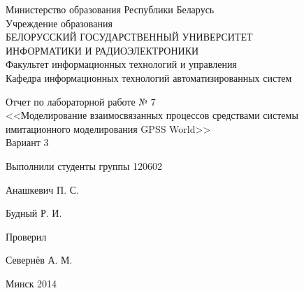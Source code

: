 \thispagestyle{empty}
\setlength{\parindent}{0ex} %

\begin{center}
  Министерство образования Республики Беларусь \\
  \vspace{0.5ex}
  Учреждение образования \\
  БЕЛОРУССКИЙ ГОСУДАРСТВЕННЫЙ УНИВЕРСИТЕТ \\
  ИНФОРМАТИКИ И РАДИОЭЛЕКТРОНИКИ \\
  \vspace{0.5ex}
  Факультет информационных технологий и управления \\
  \vspace{0.5ex}
  Кафедра информационных технологий автоматизированных систем
\end{center}

\vspace{50mm}

\begin{center}
  Отчет по лабораторной работе № 7 \\
  <<Моделирование взаимосвязанных процессов средствами системы
  имитационного моделирования GPSS World>> \\
  Вариант 3
\end{center}

\vspace{40mm}

\begin{minipage}{.65\linewidth}
    Выполнили студенты группы 120602
    \bigskip
\end{minipage}
\hfill
\begin{minipage}{.25\linewidth}
  \begin{flushleft}
    Анашкевич П. С.

    Будный Р. И.
  \end{flushleft}
\end{minipage}

\vspace{10mm}

\begin{minipage}{.65\linewidth}
    Проверил
\end{minipage}
\hfill
\begin{minipage}{.25\linewidth}
  \begin{flushleft}
    Севернёв А. М.

  \end{flushleft}
\end{minipage}

\vspace{40mm}
\begin{center}
  Минск 2014
\end{center}

\setlength{\parindent}{5ex} %

\newpage
